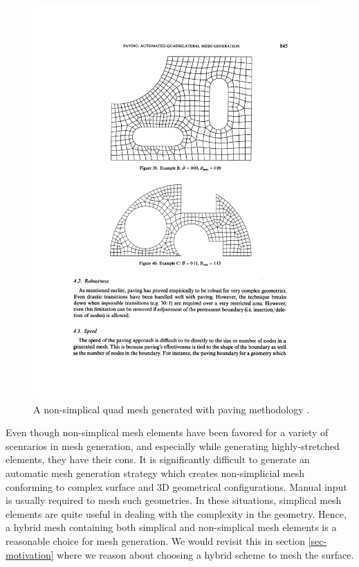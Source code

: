 \begin{figure}
	\centering
	\includegraphics[trim={0 65.5cm 0 14cm },clip,width=\linewidth]{img/intro/lit/quadMesh.png}
	\caption{A non-simplical quad mesh generated with paving methodology \cite{blacker1991paving}.}
	\label{fig-quadMesh}
\end{figure}

Even though non-simplical mesh elements have been favored for a variety of scenrarios in mesh generation, and especially while generating highly-stretched elements, they have their cons. It is significantly difficult to generate an automatic mesh generation strategy which creates non-simplicial mesh conforming to complex surface and 3D geometrical configurations. Manual input is usually required to mesh such geometries. In these situations, simplical mesh elements are quite useful in dealing with the complexity in the geometry. Hence, a hybrid mesh containing both simplical and non-simplical mesh elements is a reasonable choice for mesh generation. We would revisit this in section \ref{sec-motivation} where we reason about choosing a hybrid scheme to mesh the surface.

